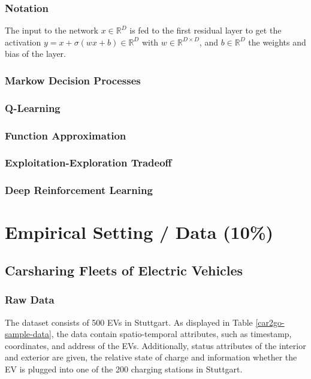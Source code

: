 \documentclass[12pt, article]{article}
\begin{document}
\subsubsection{Notation}
\label{sec:org2511302}
The input to the network \(x \in \mathbb{R}^D\) is fed to the first residual layer to get the activation \(y = x + \sigma(w x + b) \in \mathbb{R}^D\) with \(w \in \mathbb{R}^{D \times D}\), and \(b \in \mathbb{R}^D\) the weights and bias of the layer.
\subsubsection{Markow Decision Processes}
\label{sec:orgff1c56d}
\subsubsection{Q-Learning}
\label{sec:org59125c5}
\subsubsection{Function Approximation}
\label{sec:orgb936237}
\subsubsection{Exploitation-Exploration Tradeoff}
\label{sec:orgbc995b8}
\subsubsection{Deep Reinforcement Learning}
\label{sec:orgd547dee}
\section{Empirical Setting / Data (10\%)}
\label{sec:org39dd63b}
\subsection{Carsharing Fleets of Electric Vehicles}
\label{sec:orgcbac50e}
\subsubsection{Raw Data}
\label{sec:org046d073}
The dataset consists of 500 EVs in Stuttgart. As displayed in Table
\ref{car2go-sample-data}, the data contain spatio-temporal attributes, such as
timestamp, coordinates, and address of the EVs. Additionally, status attributes
of the interior and exterior are given, the relative state of charge and
information whether the EV is plugged into one of the 200 charging stations in
Stuttgart.
\end{document}
